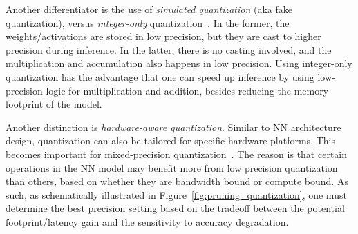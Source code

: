 Another differentiator is the use of \emph{simulated quantization} (aka fake quantization), versus \emph{integer-only} quantization~\cite{jacob2018quantization,yao2020hawqv3,kim2021bert,lin2016fixed}. In the former, 
the weights/activations are stored in low precision, but they are cast to higher precision during
inference. In the latter, there is no casting involved, and the multiplication and accumulation also happens
in low precision. Using integer-only quantization has the advantage that one can speed up
inference by using low-precision logic for multiplication and addition, besides reducing the memory footprint of the model.


Another distinction is \emph{hardware-aware quantization}. 
Similar to NN architecture design, quantization can also be tailored for specific hardware platforms.
This becomes important for mixed-precision quantization~\cite{zhou2018adaptive, wang2018haq, wu2018mixed, hawq, shen2020q, hawqv2, yao2020hawqv3}.
The reason is that certain operations in the NN model may benefit more from low precision
quantization than others, based on whether they are bandwidth bound or compute bound.
As such, as schematically
illustrated in Figure~\ref{fig:pruning_quantization},
one must determine the best precision setting based on the tradeoff between the potential footprint/latency gain and the sensitivity to accuracy degradation.



